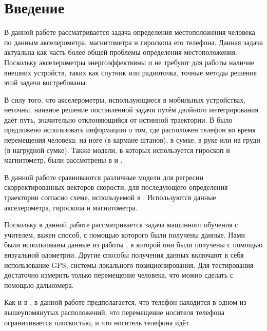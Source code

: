 \documentclass[12pt,twoside]{article}
\title
    {Определение местоположения по сигналам акселерометра}
\author
    {Макаров~М.\,В.} %
\begin{document}
\maketitle

\section{Введение}

    
В данной работе рассматривается задача определения местоположения человека по данным акселерометра, магнитометра и гироскопа его телефона. Данная задача актуальна как часть
более общей проблемы определения местоположения. Поскольку акселерометры энергоэффективны и не требуют для работы наличие внешних устройств, таких как спутник или радиоточка, точные методы решения этой задачи востребованы.
    
В силу того, что акселерометры, использующиеся в мобильных устройствах, неточны,
наивное решение поставленной задачи путём двойного интегрирования даёт путь, значительно отклоняющийся от истинной траектории.
В \cite{journals/corr/abs-1712-09004} было предложено использовать информацию о том, где расположен телефон во время перемещения человека: на ноге (в кармане штанов), в сумке, в руке или на груди (в нагрудной сумке). Также модели, в которых используется гироскоп и магнитометр, были рассмотрены в \cite{6987239} и \cite{s18051391}.


В данной работе сравниваются различные модели для регресии скорректированных векторов скорости, для последующего определения траектории согласно схеме, используемой в \cite{journals/corr/abs-1712-09004}. Используются данные акселерометра, гироскопа и магнитометра.

Поскольку в данной работе рассматривается задача машинного обучения с учителем, 
важен способ, с помощью которого были получены данные. Нами были использованы данные из работы \cite{journals/corr/abs-1712-09004}, в которой они были получены с помощью визуальной одометрии. Другие способы получения данных включают в себя использование GPS, системы локального позиционирования. Для тестирования достаточно измерить только перемещение человека, что можно сделать с помощью дальномера.

Как и в \cite{journals/corr/abs-1712-09004}, в данной работе предполагается, что телефон находится в одном из вышеупомянутых расположений, что перемещение носителя телефона ограничивается плоскостью, и что носитель телефона идёт.
\end{document}
